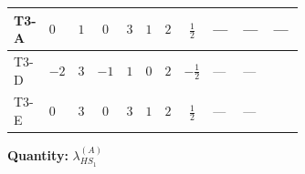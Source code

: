 \documentclass[8pt]{article}
\begin{document}
\begin{landscape}
\begin{longtable}{@{}llcccccc >{\raggedright\arraybackslash}p{0.21\linewidth} >{\raggedright\arraybackslash}p{0.21\linewidth} >{\raggedright\arraybackslash}p{0.21\linewidth}@{}}
\midrule
T3-A & $0$ & $1$ & $0$ & $3$ & $1$ & $2$ & $\frac{1}{2}$ & --- & --- & --- \\
\midrule
T3-D & $-2$ & $3$ & $-1$ & $1$ & $0$ & $2$ & $-\frac{1}{2}$ & --- & --- & \scriptsize\adjustbox{max width=\linewidth}{$\begin{gathered} +2 {\lambda_1} {\lambda_{HS_1}^{(A)}}\end{gathered}$} \\
\midrule
T3-E & $0$ & $3$ & $0$ & $3$ & $1$ & $2$ & $\frac{1}{2}$ & --- & --- & \scriptsize\adjustbox{max width=\linewidth}{$\begin{gathered} +2 {\lambda_1} {\lambda_{HS_1}^{(A)}}\end{gathered}$} \\
\midrule
\bottomrule
\end{longtable}
\clearpage
\noindent\textbf{Quantity: }$\lambda_{HS_1}^{(A)}$\par\smallskip

\end{landscape}
\end{document}
